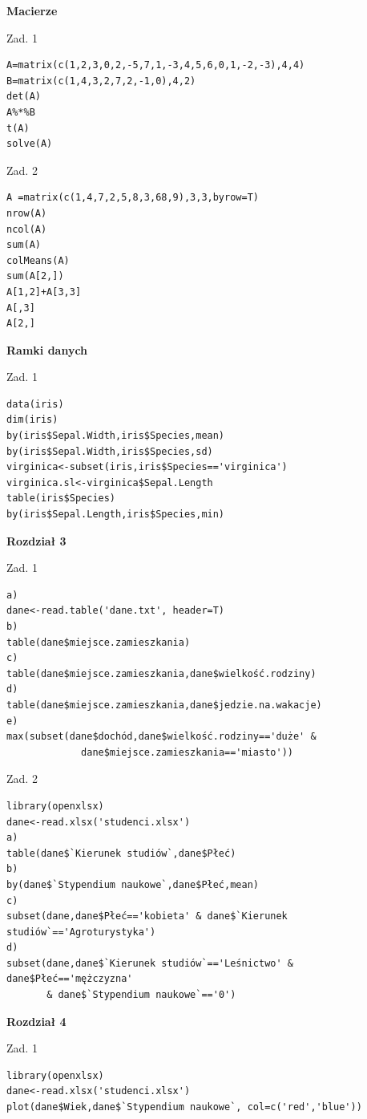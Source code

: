 \documentclass[12pt,B5paper,]{book}
\begin{document}
\textbf{Macierze}

Zad. 1

\begin{verbatim}
A=matrix(c(1,2,3,0,2,-5,7,1,-3,4,5,6,0,1,-2,-3),4,4)
B=matrix(c(1,4,3,2,7,2,-1,0),4,2)
det(A)
A%*%B
t(A)
solve(A)
\end{verbatim}

Zad. 2

\begin{verbatim}
A =matrix(c(1,4,7,2,5,8,3,68,9),3,3,byrow=T)
nrow(A)
ncol(A)
sum(A)
colMeans(A)
sum(A[2,])
A[1,2]+A[3,3]
A[,3]
A[2,]
\end{verbatim}

\vspace{0.4cm} \textbf{Ramki danych}

Zad. 1

\begin{verbatim}
data(iris)
dim(iris)
by(iris$Sepal.Width,iris$Species,mean)
by(iris$Sepal.Width,iris$Species,sd)
virginica<-subset(iris,iris$Species=='virginica')
virginica.sl<-virginica$Sepal.Length
table(iris$Species)
by(iris$Sepal.Length,iris$Species,min)
\end{verbatim}

\vspace{0.8cm} \textbf{Rozdział 3}

Zad. 1

\begin{verbatim}
a)
dane<-read.table('dane.txt', header=T)
b)
table(dane$miejsce.zamieszkania)
c)
table(dane$miejsce.zamieszkania,dane$wielkość.rodziny)
d)
table(dane$miejsce.zamieszkania,dane$jedzie.na.wakacje)
e)
max(subset(dane$dochód,dane$wielkość.rodziny=='duże' & 
             dane$miejsce.zamieszkania=='miasto'))
\end{verbatim}

Zad. 2

\begin{verbatim}
library(openxlsx)
dane<-read.xlsx('studenci.xlsx')
a)
table(dane$`Kierunek studiów`,dane$Płeć)
b)
by(dane$`Stypendium naukowe`,dane$Płeć,mean)
c)
subset(dane,dane$Płeć=='kobieta' & dane$`Kierunek studiów`=='Agroturystyka')
d)
subset(dane,dane$`Kierunek studiów`=='Leśnictwo' & dane$Płeć=='mężczyzna' 
       & dane$`Stypendium naukowe`=='0')
\end{verbatim}

\newpage

\textbf{Rozdział 4}

Zad. 1

\begin{verbatim}
library(openxlsx)
dane<-read.xlsx('studenci.xlsx')
plot(dane$Wiek,dane$`Stypendium naukowe`, col=c('red','blue'))
\end{verbatim}
\end{document}
